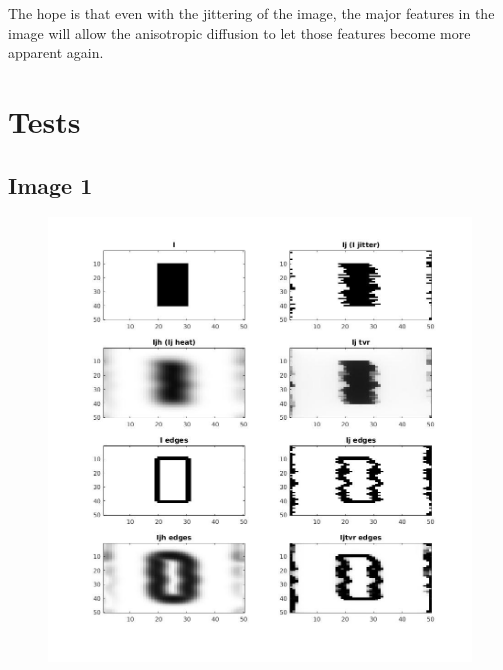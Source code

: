 \documentclass[12pt]{article}
\begin{document}
The hope is that even with the jittering of the image, the major features in the image will allow the anisotropic diffusion to let those features become more apparent again.

\section{Tests}

\subsection{Image 1}

\begin{figure}[ht!]
\centering
\includegraphics[scale=0.5]{one}
\end{figure}
\end{document}
